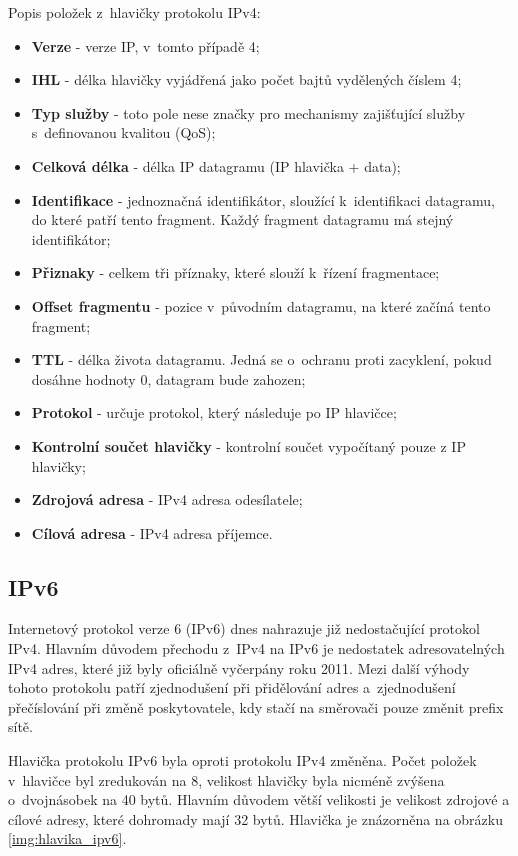 Popis položek z~hlavičky protokolu IPv4:

\begin{itemize}
    \item \textbf{Verze} - verze IP, v~tomto případě 4;
    \item \textbf{IHL} - délka hlavičky vyjádřená jako počet bajtů vydělených číslem 4;
    \item \textbf{Typ služby} - toto pole nese značky pro mechanismy zajišťující služby s~definovanou kvalitou (QoS);
    \item \textbf{Celková délka} -  délka IP datagramu (IP hlavička + data);
    \item \textbf{Identifikace} -  jednoznačná identifikátor, sloužící k~identifikaci datagramu, do které patří tento fragment. Každý fragment datagramu má stejný identifikátor;
    \item \textbf{Přiznaky} - celkem tři příznaky, které slouží k~řízení fragmentace;
    \item \textbf{Offset fragmentu} - pozice v~původním datagramu, na které začíná tento fragment;
    \item \textbf{TTL} - délka života datagramu. Jedná se o~ochranu proti zacyklení, pokud dosáhne hodnoty 0, datagram bude zahozen;
    \item \textbf{Protokol} -  určuje protokol, který následuje po IP hlavičce;
    \item \textbf{Kontrolní součet hlavičky} -  kontrolní součet vypočítaný pouze z IP hlavičky;
    \item \textbf{Zdrojová adresa} -  IPv4 adresa odesílatele;
    \item \textbf{Cílová adresa} - IPv4 adresa příjemce.
\end{itemize}

\subsection{IPv6}
Internetový protokol verze 6 (IPv6) \cite{ipv6} dnes nahrazuje již nedostačující protokol IPv4. Hlavním důvodem přechodu z~IPv4 na IPv6 je nedostatek adresovatelných IPv4 adres, které již byly oficiálně vyčerpány roku 2011. Mezi další výhody tohoto protokolu patří zjednodušení při přidělování adres a~zjednodušení přečíslování při změně poskytovatele, kdy stačí na směrovači pouze změnit prefix sítě. 

Hlavička protokolu IPv6 byla oproti protokolu IPv4 změněna. Počet položek v~hlavičce byl zredukován na 8, velikost hlavičky byla nicméně zvýšena o~dvojnásobek na 40 bytů. Hlavním důvodem větší velikosti je velikost zdrojové a cílové adresy, které dohromady mají 32 bytů. Hlavička je znázorněna na obrázku \ref{img:hlavika_ipv6}.

